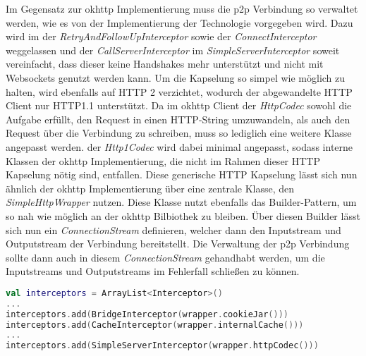         Im Gegensatz zur okhttp Implementierung muss die p2p Verbindung so verwaltet werden, wie es von der Implementierung der Technologie vorgegeben wird. Dazu wird im  der {\it RetryAndFollowUpInterceptor} sowie der {\it ConnectInterceptor} weggelassen und der {\it CallServerInterceptor} im {\it SimpleServerInterceptor} soweit vereinfacht, dass dieser keine Handshakes mehr unterstützt und nicht mit Websockets genutzt werden kann. Um die Kapselung so simpel wie möglich zu halten, wird ebenfalls auf HTTP 2 verzichtet, wodurch der abgewandelte HTTP Client nur HTTP1.1 unterstützt. Da im okhttp Client der {\it HttpCodec} sowohl die Aufgabe erfüllt, den Request in einen HTTP-String umzuwandeln, als auch den Request über die Verbindung zu schreiben, muss so lediglich eine weitere Klasse angepasst werden. der {\it Http1Codec} wird dabei minimal angepasst, sodass interne Klassen der okhttp Implementierung, die nicht im Rahmen dieser HTTP Kapselung nötig sind, entfallen. Diese generische HTTP Kapselung lässt sich nun ähnlich der okhttp Implementierung über eine zentrale Klasse, den {\it SimpleHttpWrapper} nutzen. Diese Klasse nutzt ebenfalls das Builder-Pattern, um so nah wie möglich an der okhttp Bilbiothek zu bleiben. Über diesen Builder lässt sich nun ein {\it ConnectionStream} definieren, welcher dann den Inputstream und Outputstream der Verbindung bereitstellt. Die Verwaltung der p2p Verbindung sollte dann auch in diesem {\it ConnectionStream} gehandhabt werden, um die Inputstreams und Outputstreams im Fehlerfall schließen zu können.

        \begin{lstlisting}[frame=bt, label={lst:android:okhttpchanges}, language=Kotlin, caption=Änderungen an okhttp (Clientcode in Kotlin)]
val interceptors = ArrayList<Interceptor>()
...
interceptors.add(BridgeInterceptor(wrapper.cookieJar()))
interceptors.add(CacheInterceptor(wrapper.internalCache()))
...
interceptors.add(SimpleServerInterceptor(wrapper.httpCodec()))
        \end{lstlisting}        
        
